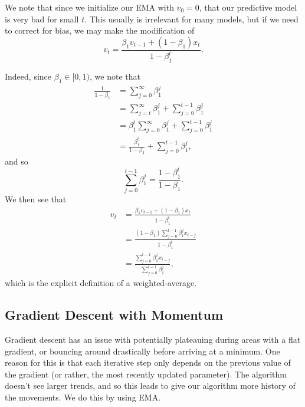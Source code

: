 \begin{remark}
	We note that since we initialize our EMA with $v_0=0$, that our predictive model is very bad for small $t$.  This usually is irrelevant for many models, but if we need to correct for bias, we may make the modification of
	$$v_t=\frac{\beta_1 v_{t-1}+(1-\beta_1)x_t}{1-\beta_1^t}.$$
	
	Indeed, since $\beta_1\in[0,1)$, we note that
\begin{align*}
	\frac{1}{1-\beta_1}&=\sum_{j=0}^\infty\beta_1^j\\
	&=\sum_{j=t}^\infty\beta_1^j+\sum_{j=0}^{t-1}\beta_1^j\\
	&=\beta_1^t\sum_{j=0}^\infty\beta_1^j+\sum_{j=0}^{t-1}\beta_1^j\\
	&=\frac{\beta_1^t}{1-\beta_1}+\sum_{j=0}^{t-1}\beta_1^j,
\end{align*}
and so
$$\sum_{j=0}^{t-1}\beta_1^j=\frac{1-\beta_1^t}{1-\beta_1}.$$
We then see that
\begin{align*}
	v_t&=\frac{\beta_1 v_{t-1}+(1-\beta_1)x_t}{1-\beta_1^t}\\
	&=\frac{(1-\beta_1)\sum_{j=0}^{t-1}\beta_1^jx_{t-j}}{1-\beta_1^t}\\
	&=\frac{\sum_{j=0}^{t-1}\beta_1^jx_{t-j}}{\sum_{j=0}^{t-1}\beta_1^j},
\end{align*}
which is the explicit definition of a weighted-average.
\end{remark}



\subsection{Gradient Descent with Momentum}
Gradient descent has an issue with potentially plateauing during areas with a flat gradient, or bouncing around drastically before arriving at a minimum.  One reason for this is that each iterative step only depends on the previous value of the gradient (or rather, the most recently updated parameter).  The algorithm doesn't see larger trends, and so this leads to give our algorithm more history of the movements.  We do this by using EMA.

